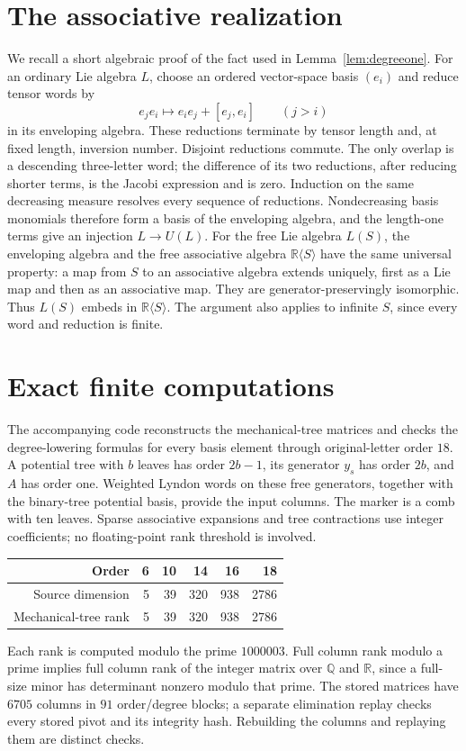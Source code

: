 \documentclass[11pt]{article}
\newcommand{\R}{\mathbb R}
\begin{document}
\appendix
\section{The associative realization}\label{sec:associative}

We recall a short algebraic proof of the fact used in
Lemma~\ref{lem:degreeone}. For an ordinary Lie algebra $L$, choose an ordered
vector-space basis $(e_i)$ and reduce tensor words by
\[
 e_je_i\longmapsto e_ie_j+[e_j,e_i]\qquad(j>i)
\]
in its enveloping algebra. These reductions terminate by tensor length and,
at fixed length, inversion number. Disjoint reductions commute. The only
overlap is a descending three-letter word; the difference of its two
reductions, after reducing shorter terms, is the Jacobi expression and is
zero. Induction on the same decreasing measure resolves every sequence of
reductions. Nondecreasing basis monomials therefore form a basis of the
enveloping algebra, and the length-one terms give an injection $L\to U(L)$.
For the free Lie algebra $L(S)$, the enveloping algebra and the free
associative algebra $\R\langle S\rangle$ have the same universal property:
a map from $S$ to an associative algebra extends uniquely, first as a Lie
map and then as an associative map. They are generator-preservingly
isomorphic. Thus $L(S)$ embeds in $\R\langle S\rangle$.
The argument also applies to infinite $S$, since every word and reduction
is finite.

\section{Exact finite computations}\label{sec:computations}

The accompanying code reconstructs the mechanical-tree matrices and checks
the degree-lowering formulas for every basis element through original-letter
order $18$. A potential tree with $b$ leaves has order $2b-1$, its generator
$y_s$ has order $2b$, and $A$ has order one. Weighted Lyndon words on these
free generators, together with the binary-tree potential basis, provide the
input columns. The marker is a comb with ten leaves. Sparse associative
expansions and tree contractions use integer coefficients; no floating-point
rank threshold is involved.

\begin{center}
\begin{tabular}{@{}rrrrrr@{}}\toprule
Order & 6 & 10 & 14 & 16 & 18\\\midrule
Source dimension & 5 & 39 & 320 & 938 & 2786\\
Mechanical-tree rank & 5 & 39 & 320 & 938 & 2786\\\bottomrule
\end{tabular}
\end{center}
Each rank is computed modulo the prime $1000003$. Full column rank modulo a
prime implies full column rank of the integer matrix over $\mathbb Q$ and
$\R$, since a full-size minor has determinant nonzero modulo that prime.
The stored matrices have $6705$ columns in $91$ order/degree blocks; a
separate elimination replay checks every stored pivot and its integrity hash.
Rebuilding the columns and replaying them are distinct checks.
\end{document}
